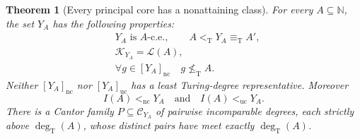 \documentclass[11pt,a4paper]{article}
\newcommand{\N}{\mathbb N}
\newcommand{\nleT}{\nleq_{\mathrm T}}
\newcommand{\eqT}{\equiv_{\mathrm T}}
\newcommand{\ltT}{<_{\mathrm T}}
\newcommand{\nc}{\mathrm{nc}}
\newcommand{\uc}{\mathrm{uc}}
\newcommand{\CD}[1]{\mathcal C_{#1}}
\newcommand{\Core}[1]{\mathcal K_{#1}}
\newcommand{\Low}[1]{\mathcal L(#1)}
\newcommand{\degT}{\operatorname{deg}_{\mathrm T}}
\newtheorem{theorem}{Theorem}[section]
\theoremstyle{definition}\newtheorem{definition}[theorem]{Definition}
\theoremstyle{remark}\newtheorem{remark}[theorem]{Remark}
\begin{document}
\begin{theorem}[Every principal core has a nonattaining class]\label{thm:prescribed}
For every $A\subseteq\N$, the set $Y_A$ has the following properties:
\begin{align}
 &Y_A\text{ is }A\text{-c.e.},\qquad A\ltT Y_A\eqT A',
                                                    \label{eq:relative-degree}\\
 &\Core{Y_A}=\Low A,                                \label{eq:relative-core}\\
 &\forall g\in[Y_A]_{\nc}\quad g\nleT A.             \label{eq:no-A-rep}
\end{align}
Neither $[Y_A]_{\nc}$ nor $[Y_A]_{\uc}$ has a least Turing-degree representative. Moreover
\[
 I(A)<_{\nc}Y_A\quad\text{and}\quad I(A)<_{\uc}Y_A.
\]
There is a Cantor family $P\subseteq\CD{Y_A}$ of pairwise incomparable degrees, each strictly above $\degT(A)$, whose distinct pairs have meet exactly $\degT(A)$.
\end{theorem}
\end{document}
